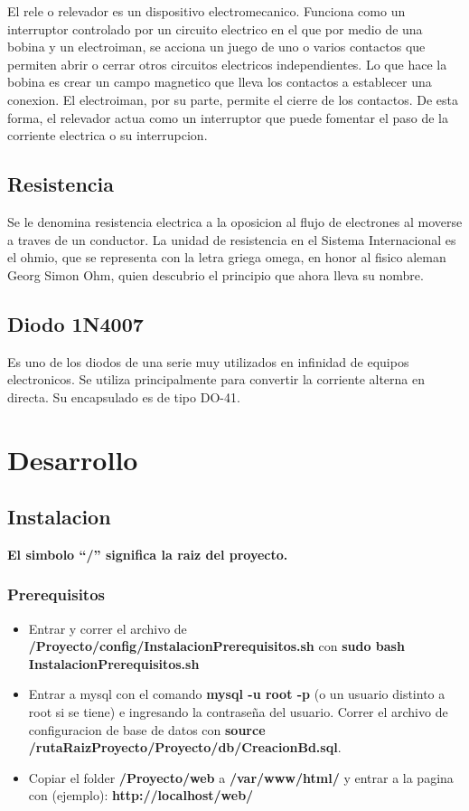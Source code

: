 \documentclass{article}
\begin{document}
El rele o relevador es un dispositivo electromecanico. Funciona como un interruptor controlado por un circuito electrico en el que por medio de una bobina y un electroiman, se acciona un juego de uno o varios contactos que permiten abrir o cerrar otros circuitos electricos independientes. Lo que hace la bobina es crear un campo magnetico que lleva los contactos a establecer una conexion. El electroiman, por su parte, permite el cierre de los contactos. De esta forma, el relevador actua como un interruptor que puede fomentar el paso de la corriente electrica o su interrupcion. 

\subsection{Resistencia}

Se le denomina resistencia electrica a la oposicion al flujo de electrones al moverse a traves de un conductor. La unidad de resistencia en el Sistema Internacional es el ohmio, que se representa con la letra griega omega, en honor al fisico aleman Georg Simon Ohm, quien descubrio el principio que ahora lleva su nombre.

\subsection{Diodo 1N4007}

Es uno de los diodos de una serie muy utilizados en infinidad de equipos electronicos. Se utiliza principalmente para convertir la corriente alterna en directa. Su encapsulado es de tipo DO-41. 

\newpage
\section{Desarrollo}

\subsection{Instalacion}
\textbf{El simbolo ``/'' significa la raiz del proyecto.}

\subsubsection{Prerequisitos}

\begin{itemize}
	\item Entrar y correr el archivo de \textbf{/Proyecto/config/InstalacionPrerequisitos.sh} con \textbf{sudo bash InstalacionPrerequisitos.sh}
	\item Entrar a mysql con el comando \textbf{mysql -u root -p} (o un usuario distinto a root si se tiene) e ingresando la contrase\~na del usuario. Correr el archivo de configuracion de base de datos con \textbf{source /rutaRaizProyecto/Proyecto/db/CreacionBd.sql}.
	\item Copiar el folder \textbf{/Proyecto/web} a \textbf{/var/www/html/} y entrar a la pagina con (ejemplo): \textbf{http://localhost/web/}
\end{itemize}
\end{document}
